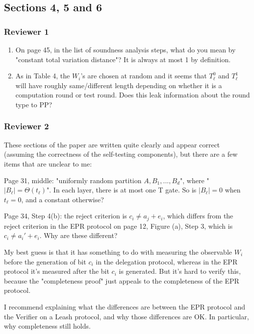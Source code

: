 \documentclass[12pt]{article}
\begin{document}
\subsection*{Sections 4, 5 and 6}
\subsubsection*{Reviewer 1}
\begin{enumerate}
\item On page 45, in the list of soundness analysis steps, what do you mean by "constant total variation distance"? It is always at most 1 by definition.
\item As in Table 4, the $W_i$'s are chosen at random and it seems that $T^0_\ell$ and $T^1_\ell$ will have roughly same/different length depending on whether it is a computation round or test round. Does this leak information about the round type to PP?

\end{enumerate}

\subsubsection*{Reviewer 2}

These sections of the paper are written quite clearly and appear correct (assuming the correctness of the self-testing components), but there are a few items that are unclear to me:

Page 31, middle: "uniformly random partition $A, B_1,..., B_d$", where "$|B_\ell| = \Theta(t_\ell)$". In each layer, there is at most one T gate. So is $|B_\ell| = 0$ when $t_\ell = 0$, and a constant otherwise?

Page 34, Step 4(b): the reject criterion is $c_i \neq a_j + e_i$, which differs from the reject criterion in the EPR protocol on page 12, Figure (a), Step 3, which is $c_i \neq a_i' + e_i$. Why are these different?

My best guess is that it has something to do with measuring the observable $W_i$ before the generation of bit $c_i$ in the delegation protocol, whereas in the EPR protocol it's measured after the bit $c_i$ is generated. But it's hard to verify this, because the "completeness proof" just appeals to the completeness of the EPR protocol.

I recommend explaining what the differences are between the EPR protocol and the Verifier on a Leash protocol, and why those differences are OK. In particular, why completeness still holds.
\end{document}
